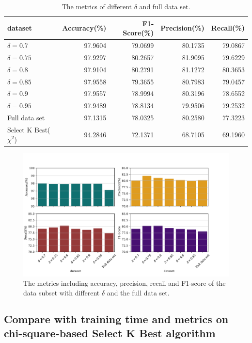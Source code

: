 \documentclass{ieeeaccess}
\theoremstyle{definition}
\begin{document}
\begin{table}
    \centering
    \caption{The metrics of different $\delta$ and full data set.}
    \label{tab:metric-full}
    \begin{tabular}{lrrrr}
        \toprule
        dataset & Accuracy(\%) & F1-Score(\%) & Precision(\%) & Recall(\%) \\
        \midrule
            $\delta=0.7$ &  97.9604 & 79.0699 & 80.1735 & 79.0867 \\
            $\delta=0.75$ &	97.9297 & 80.2657 & 81.9095 & 79.6229 \\
            $\delta=0.8$ &	97.9104 & 80.2791 & 81.1272 & 80.3653 \\
            $\delta=0.85$ &	97.9558 & 79.3655 & 80.7983 & 79.0457 \\
            $\delta=0.9$ &  97.9557 & 78.9994 & 80.3196 & 78.6552 \\
            $\delta=0.95$ &	97.9489 & 78.8134 & 79.9506 & 79.2532 \\
            Full data set &	97.1315 & 78.0325 & 80.2580 & 77.3223 \\
            Select K Best($\chi^2$) & 94.2846 & 72.1371 & 68.7105 & 69.1960 \\
        \bottomrule
    \end{tabular}
\end{table}

\begin{figure}[!htpb]
    \centering
    \includegraphics[scale=0.35]{fig/metrics-full.pdf}
    \caption{The metrics including accuracy, precision, recall and F1-score of the data subset with different $\delta$ and the full data set.}
    \label{fig:metrics-full}
\end{figure}

\subsection{Compare with training time and metrics on chi-square-based Select K Best algorithm}
\end{document}
